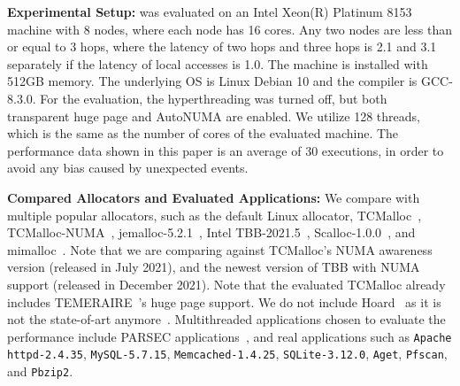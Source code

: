 \textbf{Experimental Setup:}  \NM{} was evaluated on an Intel Xeon(R) Platinum 8153 machine with 8 nodes, where each node has 16 cores. Any two nodes are less than or equal to 3 hops, where the latency of two hops and three hops is 2.1 and 3.1 separately if the latency of local accesses is 1.0. The machine is installed with 512GB memory. The underlying OS is Linux Debian 10 and the compiler is GCC-8.3.0. For the evaluation, the hyperthreading was turned off, but both transparent huge page and AutoNUMA are enabled. We utilize 128 threads, which is the same as the number of cores of the evaluated machine. The performance data shown in this paper is an average of 30 executions, in order to avoid any bias caused by unexpected events.  

\textbf{Compared Allocators and Evaluated Applications: }  We compare \NM{} with multiple popular allocators, such as the default Linux allocator, TCMalloc~\cite{tcmalloc2},  TCMalloc-NUMA~\cite{tcmallocnew}, jemalloc-5.2.1~\cite{jemalloc}, Intel TBB-2021.5~\cite{tbb2}, Scalloc-1.0.0~\cite{Scalloc}, and mimalloc~\cite{mimalloc}. Note that we are comparing against TCMalloc's NUMA awareness version (released in July 2021), and the newest version of TBB with NUMA support (released in December 2021). Note that the evaluated TCMalloc already includes TEMERAIRE~\cite{TEMERAIRE}'s huge page support.  
We do not include Hoard~\cite{Hoard} as it is not the state-of-art anymore~\cite{Scalloc, mimalloc}. Multithreaded applications chosen to evaluate the performance include PARSEC applications~\cite{parsec}, and real applications such as \texttt{Apache httpd-2.4.35}, \texttt{MySQL-5.7.15}, \texttt{Memcached-1.4.25}, \texttt{SQLite-3.12.0}, \texttt{Aget}, \texttt{Pfscan}, and \texttt{Pbzip2}. 




